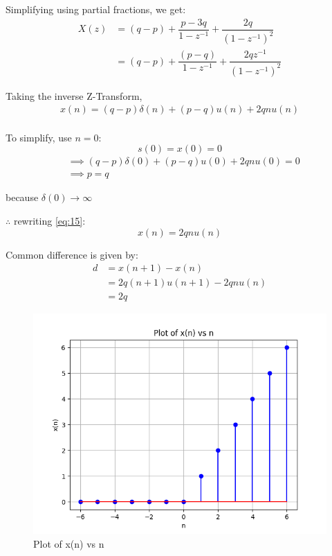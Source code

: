 \documentclass[journal,12pt,twocolumn]{IEEEtran}
\theoremstyle{remark}
\begin{document}
Simplifying using partial fractions, we get:
\begin{align}
    X(z) &= (q-p) + \dfrac{p-3q}{1-z^{-1}} + \dfrac{2q}{(1-z^{-1})^2}\\
    &= (q - p) + \dfrac{(p-q)}{1-z^{-1}} + \dfrac{2qz^{-1}}{(1-z^{-1})^2}
\end{align}

Taking the inverse Z-Transform,
\begin{align}
    x(n) = (q-p)\delta(n) + (p-q)u(n) + 2qnu(n)\label{eq:15}
\end{align}
\\
To simplify, use $n=0$:
\begin{equation}
    s(0) = x(0) = 0
\end{equation}
\begin{align}
    &\implies (q-p)\delta(0) + (p-q)u(0) + 2qnu(0) = 0\\
    &\implies p = q
\end{align}

because $\delta(0) \rightarrow \infty$

$\therefore$ rewriting \eqref{eq:15}:
\begin{equation}
    x(n) = 2qnu(n)
\end{equation}

Common difference is given by:
\begin{align}
    d &= x(n+1) - x(n)\\
    &= 2q(n+1)u(n+1) - 2qnu(n)\\
    &= 2q
\end{align}

\begin{figure}[!h]
    \centering
    \includegraphics[width = \columnwidth]{figs/x_plot.png}
    \caption{Plot of x(n) vs n}
    \label{fig:1}
\end{figure}
\end{document}
